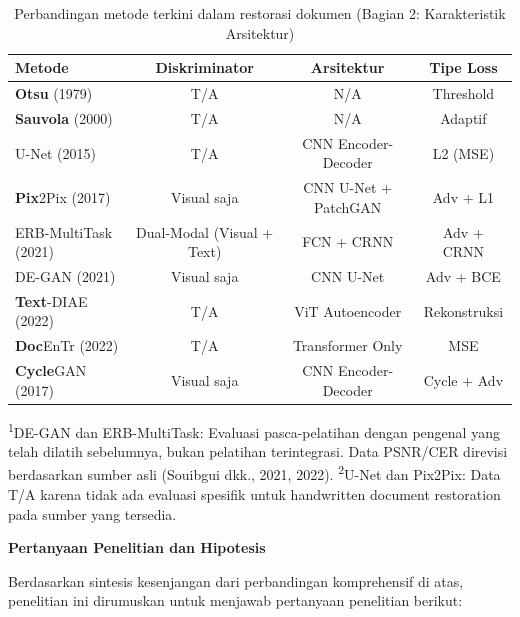 \begin{table}[H]
\centering
\caption{Perbandingan metode terkini dalam restorasi dokumen (Bagian 2: Karakteristik Arsitektur)}
\label{tab:sota-comparison-arch}
\footnotesize
\begin{tabular}{|l|c|c|c|}
\hline
\textbf{Metode} & \textbf{Diskriminator} & \textbf{Arsitektur} & \textbf{Tipe Loss} \\ \hline
\textbf{Otsu} (1979) & T/A & N/A & Threshold \\ \hline
\textbf{Sauvola} (2000) & T/A & N/A & Adaptif \\ \hline
U-Net (2015) & T/A & CNN Encoder-Decoder & L2 (MSE) \\ \hline
\textbf{Pix}2Pix (2017) & Visual saja & CNN U-Net + PatchGAN & Adv + L1 \\ \hline
ERB-MultiTask (2021) & Dual-Modal (Visual + Text) & FCN + CRNN & Adv + CRNN \\ \hline
DE-GAN (2021) & Visual saja & CNN U-Net & Adv + BCE \\ \hline
\textbf{Text}-DIAE (2022) & T/A & ViT Autoencoder & Rekonstruksi \\ \hline
\textbf{Doc}EnTr (2022) & T/A & Transformer Only & MSE \\ \hline
\textbf{Cycle}GAN (2017) & Visual saja & CNN Encoder-Decoder & Cycle + Adv \\ \hline
\end{tabular}
\end{table}


{\footnotesize\textsuperscript{1}DE-GAN dan ERB-MultiTask: Evaluasi pasca-pelatihan dengan pengenal yang telah dilatih sebelumnya, bukan pelatihan terintegrasi. Data PSNR/CER direvisi berdasarkan sumber asli (Souibgui dkk., 2021, 2022).
\textsuperscript{2}U-Net dan Pix2Pix: Data T/A karena tidak ada evaluasi spesifik untuk handwritten document restoration pada sumber yang tersedia.}

\vspace{1ex}
\noindent\textbf{Pertanyaan Penelitian dan Hipotesis}

\vspace{0.5ex}
Berdasarkan sintesis kesenjangan dari perbandingan komprehensif di atas, penelitian ini dirumuskan untuk menjawab pertanyaan penelitian berikut:

